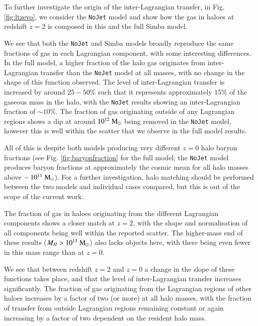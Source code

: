 \documentclass[fleqn,usenatbib]{mnras}
\newcommand{\msolar}{\;{\rm M}_{\odot}}
\newcommand{\simba}{{\sc Simba}}
\newcommand{\nojet}{{\tt NoJet}}
\begin{document}
To further investigate the origin of the inter-Lagrangian transfer, in Fig.
\ref{fig:ltzevo}, we consider the \nojet{} model and show how the gas in
haloes at redshift $z=2$ is composed in this and the full \simba{} model.

We see that both the \nojet{} and \simba{} models broadly reproduce the same
fractions of gas in each Lagrangian component, with some interesting
differences. In the full model, a higher fraction of the halo gas originates
from inter-Lagrangian transfer than the \nojet{} model at all masses, with no
change in the shape of this function observed. The level of inter-Lagrangian
transfer is increased by around $25-50\%$ such that it represents
approximately $15\%$ of the gaseous mass in the halo, with the \nojet{}
results showing an inter-Lagrangian fraction of $\sim10\%$. The fraction of
gas originating outside of any Lagrangian regions shows a dip at around
$10^{12}\msolar{}$ being removed in the \nojet{} model, however this is well
within the scatter that we observe in the full model results.

All of this is despite both models producing very different $z=0$ halo baryon
fractions (see Fig. \ref{fig:baryonfraction} for the full model; the \nojet{}
model produces baryon fractions at approximately the cosmic mean for all halo
masses above $\sim10^{11}\msolar{}$). For a further investigation, halo matching
should be performed between the two models and individual cases compared, but
this is out of the scope of the current work.

The fraction of gas in haloes originating from the different Lagrangian
components shows a closer match at $z=2$, with the shape and
normalisation of all components being well within the reported scatter. The
higher-mass end of these results ($M_H > 10^{13}\msolar{}$) also lacks
objects here, with there being even fewer in this mass range than at $z=0$.

We see that between redshift $z=2$ and $z=0$ a change in the slope
of these functions takes place, and that the level of inter-Lagrangian transfer
increases significantly. The fraction of gas originating from the Lagrangian 
regions of other haloes increases by a factor of two (or more) at all halo
masses, with the fraction of transfer from outside Lagrangian regions remaining
constant or again increasing by a factor of two dependent on the resident halo mass.
\end{document}
